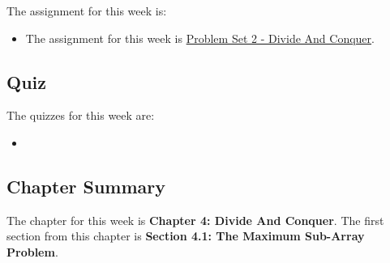 The assignment for this week is:

\begin{itemize}
    \item The assignment for this week is \href{https://github.com/QuantumCompiler/CU/tree/main/CSPB%203104%20-%20Algorithms/CSPB%203104%20-%20Assignments/CSPB%203104%20-%20Problem%20Sets/CSPB%203104%20-%20Problem%20Set%202%20-%20Divide%20And%20Conquer}{Problem Set 2 - Divide And Conquer}. 
\end{itemize}

\subsection{Quiz}

The quizzes for this week are:

\begin{itemize}
    \item {} \textbullet {} 
\end{itemize}

\subsection{Chapter Summary}

The chapter for this week is \textbf{Chapter 4: Divide And Conquer}. The first section from this chapter is \textbf{Section 4.1: The Maximum Sub-Array Problem}.

